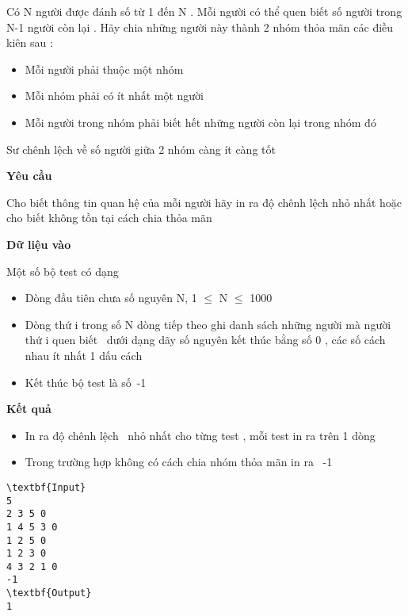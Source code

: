 

Có N người được đánh số từ 1 đến N . Mỗi người có thể quen biết số người trong N-1 người còn lại . Hãy chia những người này thành 2 nhóm thỏa mãn các điều kiên sau :
\begin{itemize}
	\item Mỗi người phải thuộc một nhóm
	\item Mỗi nhóm phải có ít nhất một người
	\item Mỗi người trong nhóm phải biết hết những người còn lại trong nhóm đó
\end{itemize}

Sư chênh lệch về số người giữa 2 nhóm càng ít càng tốt

\textbf{Yêu cầu}

Cho biết thông tin quan hệ của mỗi người hãy in ra độ chênh lệch nhỏ nhất hoặc cho biết không tồn tại cách chia thỏa mãn

\textbf{Dữ liệu vào}

Một số bộ test có dạng
\begin{itemize}
	\item Dòng đầu tiên chưa số nguyên N, 1  $\le$  N  $\le$  1000
	\item Dòng thứ i trong số N dòng tiếp theo ghi danh sách những người mà người thứ i quen biết  dưới dạng dãy số nguyên kết thúc bằng số 0 , các số cách nhau ít nhất 1 dấu cách
	\item Kết thúc bộ test là số -1
\end{itemize}

\textbf{Kết quả }
\begin{itemize}
	\item In ra độ chênh lệch  nhỏ nhất cho từng test , mỗi test in ra trên 1 dòng
	\item Trong trường hợp không có cách chia nhóm thỏa mãn in ra  -1
\end{itemize}
\begin{verbatim}
\textbf{Input}
5
2 3 5 0
1 4 5 3 0
1 2 5 0
1 2 3 0
4 3 2 1 0
-1
\textbf{Output}
1\end{verbatim}
